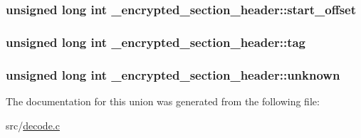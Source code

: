 \hypertarget{union__encrypted__section__header_ac175595a9413b18eeccd1ba0af98995d}{
\subsubsection[{start\-\_\-offset}]{\setlength{\rightskip}{0pt plus 5cm}unsigned long int {\bf \-\_\-encrypted\-\_\-section\-\_\-header\-::start\-\_\-offset}}}\label{union__encrypted__section__header_ac175595a9413b18eeccd1ba0af98995d}
\hypertarget{union__encrypted__section__header_aa75b122b856a48553322c09d2c763614}{
\subsubsection[{tag}]{\setlength{\rightskip}{0pt plus 5cm}unsigned long int {\bf \-\_\-encrypted\-\_\-section\-\_\-header\-::tag}}}\label{union__encrypted__section__header_aa75b122b856a48553322c09d2c763614}
\hypertarget{union__encrypted__section__header_af59fced20be27fa7707301d529bd6556}{
\subsubsection[{unknown}]{\setlength{\rightskip}{0pt plus 5cm}unsigned long int {\bf \-\_\-encrypted\-\_\-section\-\_\-header\-::unknown}}}\label{union__encrypted__section__header_af59fced20be27fa7707301d529bd6556}


\-The documentation for this union was generated from the following file\-:\begin{DoxyCompactItemize}
\item 
src/\hyperlink{decode_8c}{decode.\-c}\end{DoxyCompactItemize}
